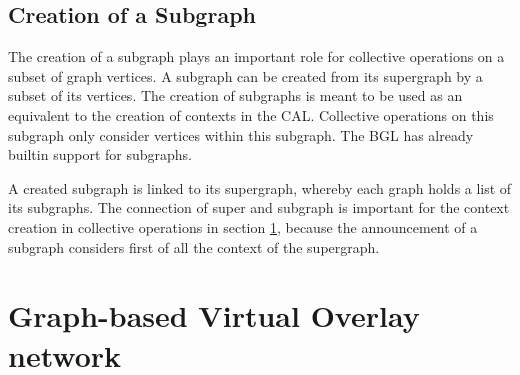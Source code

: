 \subsection{Creation of a Subgraph}
The creation of a subgraph plays an important role for collective
operations on a subset of graph vertices. A subgraph can be created
from its supergraph by a subset of its vertices.  The creation of
subgraphs is meant to be used as an equivalent to the creation of
contexts in the CAL. Collective operations on this subgraph only
consider vertices within this subgraph. The BGL has already builtin
support for subgraphs.

A created subgraph is linked to its supergraph, whereby each graph
holds a list of its subgraphs. The connection of super and subgraph is
important for the context creation in collective operations in section
\ref{sec:gvon_impl}, because the announcement of a subgraph considers
first of all the context of the supergraph.


\section{Graph-based Virtual Overlay network}
\label{sec:gvon_impl}

